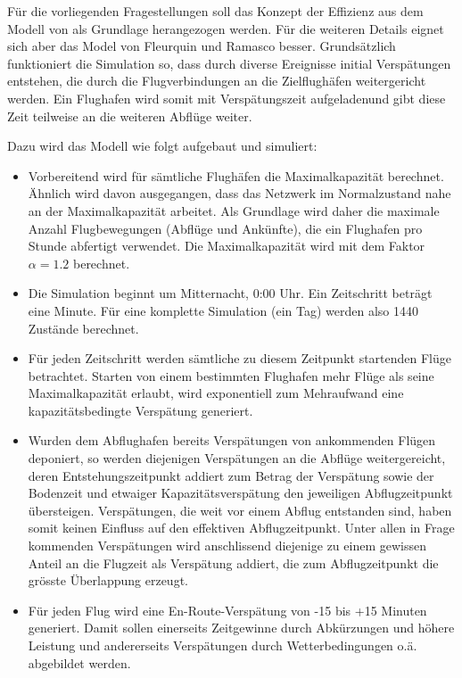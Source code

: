 Für die vorliegenden Fragestellungen soll das Konzept der Effizienz aus dem Modell von\cite{anh-tran-worldwide-aviation-network} als Grundlage herangezogen werden.
Für die weiteren Details eignet sich aber das Model von Fleurquin und Ramasco besser\cite{fleurquin-ramasco}.
Grundsätzlich funktioniert die Simulation so, dass durch diverse Ereignisse initial Verspätungen entstehen, die durch die
Flugverbindungen an die Zielflughäfen weitergericht werden.
Ein Flughafen wird somit mit Verspätungszeit \guillemotleft aufgeladen\guillemotright und gibt diese Zeit teilweise an die weiteren Abflüge weiter.

Dazu wird das Modell wie folgt aufgebaut und simuliert:

\begin{itemize}
    \item Vorbereitend wird für sämtliche Flughäfen die Maximalkapazität berechnet. Ähnlich \cite{anh-tran-worldwide-aviation-network} wird davon ausgegangen, dass das Netzwerk im Normalzustand nahe an der Maximalkapazität arbeitet. Als Grundlage wird daher die maximale Anzahl Flugbewegungen (Abflüge und Ankünfte), die ein Flughafen pro Stunde abfertigt verwendet. Die Maximalkapazität wird mit dem Faktor $\alpha = 1.2$ berechnet.
    \item Die Simulation beginnt um Mitternacht, 0:00 Uhr. Ein Zeitschritt beträgt eine Minute. Für eine komplette Simulation (ein Tag) werden also 1440 Zustände berechnet.
    \item Für jeden Zeitschritt werden sämtliche zu diesem Zeitpunkt startenden Flüge betrachtet. Starten von einem bestimmten Flughafen mehr Flüge als seine Maximalkapazität erlaubt, wird exponentiell zum Mehraufwand eine kapazitätsbedingte Verspätung generiert.
    \item Wurden dem Abflughafen bereits Verspätungen von ankommenden Flügen deponiert, so werden diejenigen Verspätungen an die Abflüge weitergereicht, deren Entstehungszeitpunkt addiert zum Betrag der Verspätung sowie der Bodenzeit und etwaiger Kapazitätsverspätung den jeweiligen Abflugzeitpunkt übersteigen. Verspätungen, die weit vor einem Abflug entstanden sind, haben somit keinen Einfluss auf den effektiven Abflugzeitpunkt. Unter allen in Frage kommenden Verspätungen wird anschlissend diejenige zu einem gewissen Anteil an die Flugzeit als Verspätung addiert, die zum Abflugzeitpunkt die grösste Überlappung erzeugt.
    \item Für jeden Flug wird eine En-Route-Verspätung von -15 bis +15 Minuten generiert. Damit sollen einerseits Zeitgewinne durch Abkürzungen und höhere Leistung und andererseits Verspätungen durch Wetterbedingungen o.ä. abgebildet werden.

\end{itemize}
